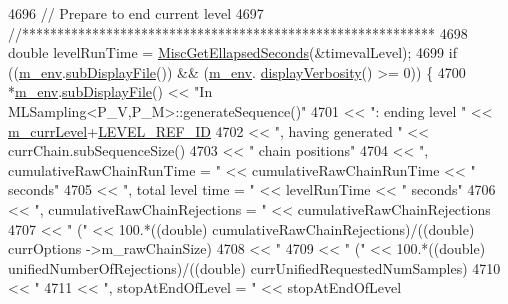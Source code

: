 \begin{DoxyCode}
{{4696     \textcolor{comment}{// Prepare to end current level}
4697     \textcolor{comment}{//***********************************************************}
4698     \textcolor{keywordtype}{double} levelRunTime = \hyperlink{namespace_q_u_e_s_o_a424bc33f2e6e287fd468408d14b772ee}{MiscGetEllapsedSeconds}(&timevalLevel);
4699     \textcolor{keywordflow}{if} ((\hyperlink{class_q_u_e_s_o_1_1_m_l_sampling_a13f1ca4fe9f94822fe572a743eaced1d}{m\_env}.\hyperlink{class_q_u_e_s_o_1_1_base_environment_a8a0064746ae8dddfece4229b9ad374d6}{subDisplayFile}()) && (\hyperlink{class_q_u_e_s_o_1_1_m_l_sampling_a13f1ca4fe9f94822fe572a743eaced1d}{m\_env}.
      \hyperlink{class_q_u_e_s_o_1_1_base_environment_a1fe5f244fc0316a0ab3e37463f108b96}{displayVerbosity}() >= 0)) \{
4700       *\hyperlink{class_q_u_e_s_o_1_1_m_l_sampling_a13f1ca4fe9f94822fe572a743eaced1d}{m\_env}.\hyperlink{class_q_u_e_s_o_1_1_base_environment_a8a0064746ae8dddfece4229b9ad374d6}{subDisplayFile}() << \textcolor{stringliteral}{"In MLSampling<P\_V,P\_M>::generateSequence()"}
4701                               << \textcolor{stringliteral}{": ending level "}                   << 
      \hyperlink{class_q_u_e_s_o_1_1_m_l_sampling_af9416874c856e50f3b35270e801f17e4}{m\_currLevel}+\hyperlink{_m_l_sampling_level_options_8h_a68d15eaf394d210effcf584b938206d3}{LEVEL\_REF\_ID}
4702                               << \textcolor{stringliteral}{", having generated "}               << currChain.subSequenceSize()
4703                               << \textcolor{stringliteral}{" chain positions"}
4704                               << \textcolor{stringliteral}{", cumulativeRawChainRunTime = "}    << cumulativeRawChainRunTime << \textcolor{stringliteral}{"
       seconds"}
4705                               << \textcolor{stringliteral}{", total level time = "}             << levelRunTime              << \textcolor{stringliteral}{"
       seconds"}
4706                               << \textcolor{stringliteral}{", cumulativeRawChainRejections = "} << cumulativeRawChainRejections
4707                               << \textcolor{stringliteral}{" ("} << 100.*((double) cumulativeRawChainRejections)/((double) currOptions
      ->m\_rawChainSize)
4708                               << \textcolor{stringliteral}{"%
4709                               << \textcolor{stringliteral}{" ("} << 100.*((double) unifiedNumberOfRejections)/((double) 
      currUnifiedRequestedNumSamples)
4710                               << \textcolor{stringliteral}{"%
4711                               << \textcolor{stringliteral}{", stopAtEndOfLevel = "} << stopAtEndOfLevel
}}}}
\end{DoxyCode}
